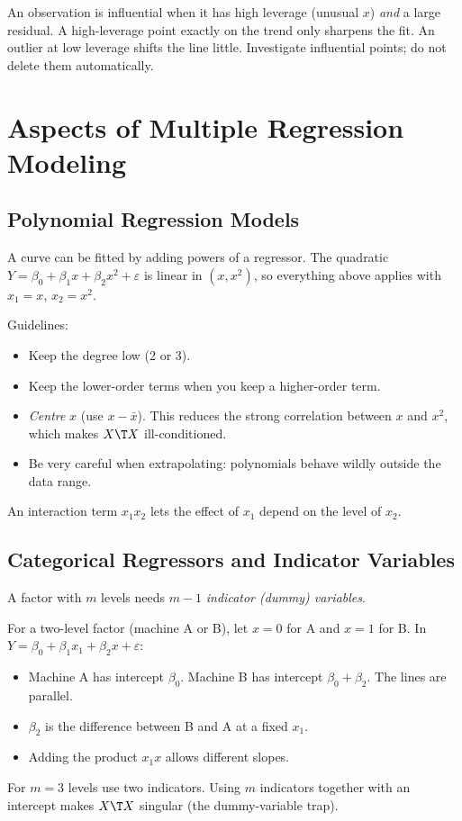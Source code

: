 An observation is influential when it has high leverage (unusual $x$) \emph{and} a large residual. A high-leverage point exactly on the trend only sharpens the fit. An outlier at low leverage shifts the line little. Investigate influential points; do not delete them automatically.

\section{Aspects of Multiple Regression Modeling}

\subsection{Polynomial Regression Models}

A curve can be fitted by adding powers of a regressor. The quadratic $Y=\beta_0+\beta_1x+\beta_2x^2+\varepsilon$ is linear in $(x,x^2)$, so everything above applies with $x_1=x$, $x_2=x^2$.

Guidelines:
\begin{itemize}
  \item Keep the degree low (2 or 3).
  \item Keep the lower-order terms when you keep a higher-order term.
  \item \emph{Centre} $x$ (use $x-\bar{x}$). This reduces the strong correlation between $x$ and $x^2$, which makes $X\T X$ ill-conditioned.
  \item Be very careful when extrapolating: polynomials behave wildly outside the data range.
\end{itemize}
An interaction term $x_1x_2$ lets the effect of $x_1$ depend on the level of $x_2$.

\subsection{Categorical Regressors and Indicator Variables}

A factor with $m$ levels needs $m-1$ \emph{indicator (dummy) variables}.

For a two-level factor (machine A or B), let $x=0$ for A and $x=1$ for B. In $Y=\beta_0+\beta_1x_1+\beta_2x+\varepsilon$:
\begin{itemize}
  \item Machine A has intercept $\beta_0$. Machine B has intercept $\beta_0+\beta_2$. The lines are parallel.
  \item $\beta_2$ is the difference between B and A at a fixed $x_1$.
  \item Adding the product $x_1x$ allows different slopes.
\end{itemize}
For $m=3$ levels use two indicators. Using $m$ indicators together with an intercept makes $X\T X$ singular (the dummy-variable trap).


